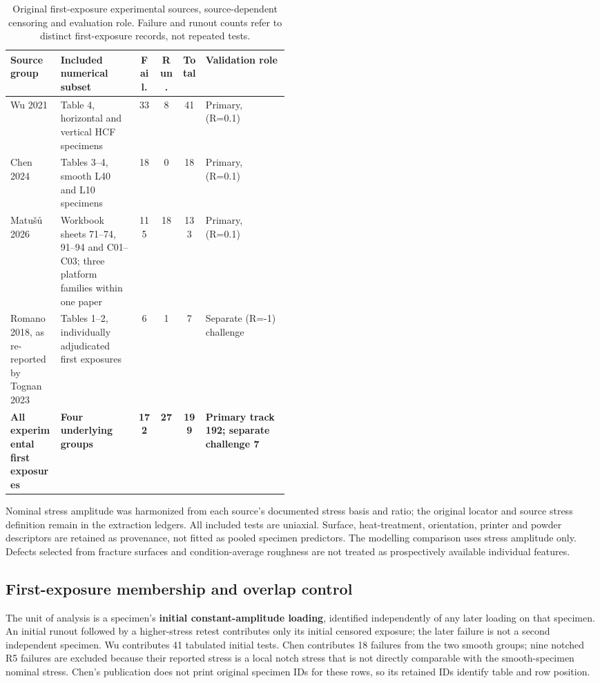 \documentclass[12pt,a4paper]{article}
\begin{document}
\begin{table}[!htbp]
\centering
\caption{Original first-exposure experimental sources, source-dependent censoring and evaluation role. Failure and runout counts refer to distinct first-exposure records, not repeated tests.}
\label{tab:1}
\begingroup
\scriptsize
\setlength{\tabcolsep}{2pt}
\renewcommand{\arraystretch}{1.10}
\begin{tabularx}{\linewidth}{@{}>{\raggedright\arraybackslash}p{0.18\linewidth}>{\raggedright\arraybackslash}p{0.29\linewidth}ccc>{\raggedright\arraybackslash}X@{}}
\toprule
Source group & Included numerical subset & Fail. & Run. & Total & Validation role \\ \midrule
Wu 2021 & Table 4, horizontal and vertical HCF specimens & 33 & 8 & 41 & Primary, (R=0.1) \\
Chen 2024 & Tables 3–4, smooth L40 and L10 specimens & 18 & 0 & 18 & Primary, (R=0.1) \\
Matušů 2026 & Workbook sheets 71–74, 91–94 and C01–C03; three platform families within one paper & 115 & 18 & 133 & Primary, (R=0.1) \\
Romano 2018, as re-reported by Tognan 2023 & Tables 1–2, individually adjudicated first exposures & 6 & 1 & 7 & Separate (R=-1) challenge \\
\textbf{All experimental first exposures} & \textbf{Four underlying groups} & \textbf{172} & \textbf{27} & \textbf{199} & \textbf{Primary track 192; separate challenge 7} \\
\bottomrule
\end{tabularx}
\endgroup
\end{table}
\FloatBarrier

Nominal stress amplitude was harmonized from each source’s documented stress basis and ratio; the original locator and source stress definition remain in the extraction ledgers. All included tests are uniaxial. Surface, heat-treatment, orientation, printer and powder descriptors are retained as provenance, not fitted as pooled specimen predictors. The modelling comparison uses stress amplitude only. Defects selected from fracture surfaces and condition-average roughness are not treated as prospectively available individual features.

\subsection{First-exposure membership and overlap control}

The unit of analysis is a specimen’s \textbf{initial constant-amplitude loading}, identified independently of any later loading on that specimen. An initial runout followed by a higher-stress retest contributes only its initial censored exposure; the later failure is not a second independent specimen. Wu contributes 41 tabulated initial tests. Chen contributes 18 failures from the two smooth groups; nine notched R5 failures are excluded because their reported stress is a local notch stress that is not directly comparable with the smooth-specimen nominal stress. Chen’s publication does not print original specimen IDs for these rows, so its retained IDs identify table and row position.
\end{document}
